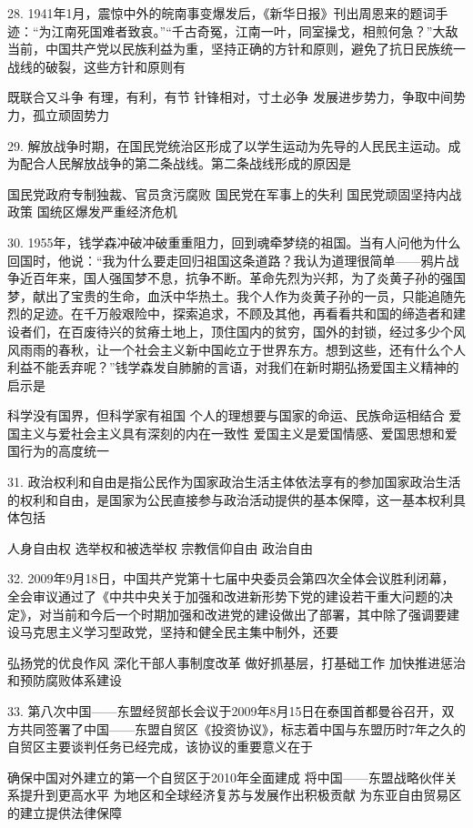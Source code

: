 28. 1941年1月，震惊中外的皖南事变爆发后，《新华日报》刊出周恩来的题词手迹：“为江南死国难者致哀。”“千古奇冤，江南一叶，同室操戈，相煎何急？”大敌当前，中国共产党以民族利益为重，坚持正确的方针和原则，避免了抗日民族统一战线的破裂，这些方针和原则有
\begin{choices}
	 既联合又斗争
	 有理，有利，有节
	 针锋相对，寸土必争
	 发展进步势力，争取中间势力，孤立顽固势力
\end{choices}
29. 解放战争时期，在国民党统治区形成了以学生运动为先导的人民民主运动。成为配合人民解放战争的第二条战线。第二条战线形成的原因是
\begin{choices}
	 国民党政府专制独裁、官员贪污腐败
	 国民党在军事上的失利
	 国民党顽固坚持内战政策
	 国统区爆发严重经济危机
\end{choices}
30. 1955年，钱学森冲破冲破重重阻力，回到魂牵梦绕的祖国。当有人问他为什么回国时，他说：“我为什么要走回归祖国这条道路？我认为道理很简单——鸦片战争近百年来，国人强国梦不息，抗争不断。革命先烈为兴邦，为了炎黄子孙的强国梦，献出了宝贵的生命，血沃中华热土。我个人作为炎黄子孙的一员，只能追随先烈的足迹。在千万般艰险中，探索追求，不顾及其他，再看看共和国的缔造者和建设者们，在百废待兴的贫瘠土地上，顶住国内的贫穷，国外的封锁，经过多少个风风雨雨的春秋，让一个社会主义新中国屹立于世界东方。想到这些，还有什么个人利益不能丢弃呢？”钱学森发自肺腑的言语，对我们在新时期弘扬爱国主义精神的启示是
\begin{choices}
	 科学没有国界，但科学家有祖国
	 个人的理想要与国家的命运、民族命运相结合
	 爱国主义与爱社会主义具有深刻的内在一致性
	 爱国主义是爱国情感、爱国思想和爱国行为的高度统一
\end{choices}
31. 政治权利和自由是指公民作为国家政治生活主体依法享有的参加国家政治生活的权利和自由，是国家为公民直接参与政治活动提供的基本保障，这一基本权利具体包括
\begin{choices}
	 人身自由权
	 选举权和被选举权
	 宗教信仰自由
	 政治自由
\end{choices}
32. 2009年9月18日，中国共产党第十七届中央委员会第四次全体会议胜利闭幕，全会审议通过了《中共中央关于加强和改进新形势下党的建设若干重大问题的决定》，对当前和今后一个时期加强和改进党的建设做出了部署，其中除了强调要建设马克思主义学习型政党，坚持和健全民主集中制外，还要
\begin{choices}
	 弘扬党的优良作风
	 深化干部人事制度改革
	 做好抓基层，打基础工作
	 加快推进惩治和预防腐败体系建设
\end{choices}
33. 第八次中国——东盟经贸部长会议于2009年8月15日在泰国首都曼谷召开，双方共同签署了中国——东盟自贸区《投资协议》，标志着中国与东盟历时7年之久的自贸区主要谈判任务已经完成，该协议的重要意义在于
\begin{choices}
	 确保中国对外建立的第一个自贸区于2010年全面建成
	 将中国——东盟战略伙伴关系提升到更高水平
	 为地区和全球经济复苏与发展作出积极贡献
	 为东亚自由贸易区的建立提供法律保障
\end{choices}
\vspace{6pt}
